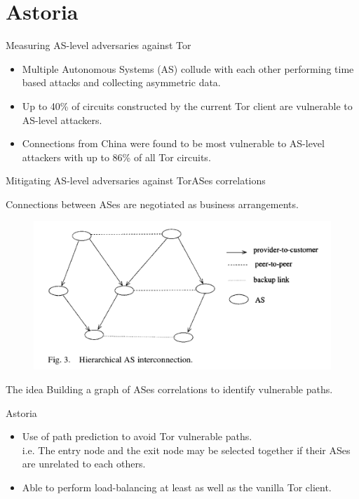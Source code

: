\section{Astoria}
\begin{frame}{Measuring AS-level adversaries against Tor}
	\begin{itemize}
		\item Multiple Autonomous Systems (AS) collude with each other
	performing time based attacks and collecting asymmetric data.

		\item Up to 40\% of circuits constructed by the current Tor
	client are vulnerable to AS-level attackers.

		\item Connections  from  China  were  found  to  be  most  vulnerable 
	to AS-level attackers with up to 86\% of
	all  Tor  circuits.
	\end{itemize}
\end{frame}


\begin{frame}{Mitigating AS-level adversaries against Tor}{ASes
correlations}

	Connections between ASes are negotiated as business arrangements.
\begin{figure}
			\centering
			\includegraphics[scale=0.18]{imgs/as_graph.png}
		\end{figure}

	\begin{block}{The idea}
		Building a graph of ASes correlations to identify vulnerable
	paths.
	
	\end{block}
	\end{frame}

\begin{frame}{Astoria}

	\begin{itemize}
		\item Use of path prediction to avoid Tor vulnerable paths.\\
	i.e. The entry node and the exit node may be selected together if their ASes 
	are unrelated to each others.
		\item Able to perform  load-balancing at least as well as the vanilla Tor
client.
	\end{itemize}


\end{frame}


